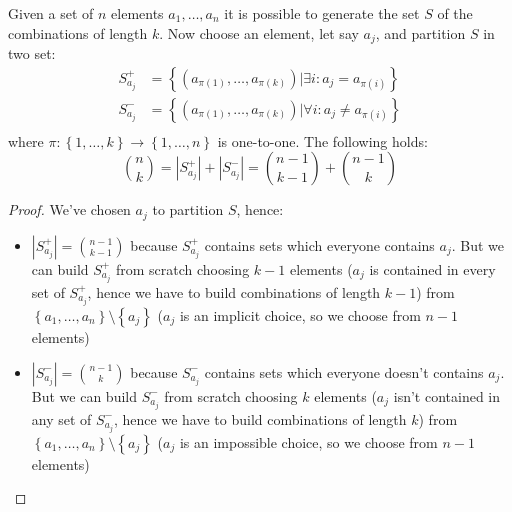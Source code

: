 Given a set of $n$ elements $a_1, \ldots,a_n$ it is possible to
generate the set $S$ of the combinations of length $k$. Now choose an
element, let say $a_j$, and partition $S$ in two set:
\begin{displaymath}
  \begin{split}
    S_{a_j}^+ &= \left \lbrace (a_{\pi(1)}, \ldots, a_{\pi(k)}) |
      \exists i: a_j = a_{\pi(i)} \right\rbrace \\
    S_{a_j}^- &= \left \lbrace (a_{\pi(1)}, \ldots, a_{\pi(k)}) |
      \forall i: a_j \not = a_{\pi(i)} \right\rbrace \\
  \end{split}
\end{displaymath}
where $\pi: \left \lbrace 1, \ldots, k \right\rbrace \rightarrow \left
  \lbrace 1, \ldots, n \right\rbrace $ is one-to-one. The following
holds:
\begin{displaymath}
  {{n}\choose{k}} = \left| S_{a_j}^+ \right| + \left| S_{a_j}^-
  \right| = {{n-1}\choose{k-1}} +  {{n-1}\choose{k}}
\end{displaymath}
\begin{proof}
  We've chosen $a_j$ to partition $S$, hence:
  \begin{itemize}
  \item $\left| S_{a_j}^+ \right| = {{n-1}\choose{k-1}}$ because
    $S_{a_j}^+$ contains sets which everyone contains $a_j$. But we
    can build $ S_{a_j}^+$ from scratch choosing $k-1$ elements ($a_j$
    is contained in every set of $S_{a_j}^+$, hence we have to build
    combinations of length $k-1$) from $\left \lbrace a_1, \ldots, a_n
    \right\rbrace \setminus \left \lbrace a_j \right\rbrace $ ($a_j$
    is an implicit choice, so we choose from $n-1$ elements)
  \item $\left| S_{a_j}^- \right| = {{n-1}\choose{k}}$ because $
    S_{a_j}^-$ contains sets which everyone doesn't contains
    $a_j$. But we can build $ S_{a_j}^- $ from scratch choosing $k$
    elements ($a_j$ isn't contained in any set of $S_{a_j}^-$, hence
    we have to build combinations of length $k$) from $\left \lbrace
      a_1, \ldots, a_n \right\rbrace \setminus \left \lbrace a_j
    \right\rbrace $ ($a_j$ is an impossible choice, so we choose from
    $n-1$ elements)
  \end{itemize}
\end{proof}

